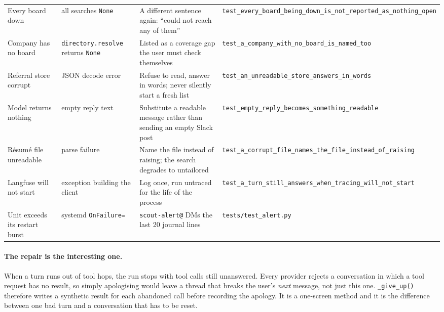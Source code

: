 \documentclass[11pt,a4paper]{article}
\begin{document}
\begin{table}[!ht]
\begin{tabularx}{\textwidth}{L{3.1cm} L{2.9cm} X L{3.4cm}}
Every board down & all searches \texttt{None} & A different sentence again: ``could not
  reach any of them'' &
  \texttt{test\_\allowbreak{}every\_\allowbreak{}board\_\allowbreak{}being\_\allowbreak{}down\_\allowbreak{}is\_\allowbreak{}not\_\allowbreak{}reported\_\allowbreak{}as\_\allowbreak{}nothing\_\allowbreak{}open} \\
Company has no board & \texttt{directory.resolve} returns \texttt{None} & Listed as a
  coverage gap the user must check themselves &
  \texttt{test\_\allowbreak{}a\_\allowbreak{}company\_\allowbreak{}with\_\allowbreak{}no\_\allowbreak{}board\_\allowbreak{}is\_\allowbreak{}named\_\allowbreak{}too} \\
Referral store corrupt & JSON decode error & Refuse to read, answer in words; never silently
  start a fresh list & \texttt{test\_\allowbreak{}an\_\allowbreak{}unreadable\_\allowbreak{}store\_\allowbreak{}answers\_\allowbreak{}in\_\allowbreak{}words} \\
Model returns nothing & empty reply text & Substitute a readable message rather than sending
  an empty Slack post & \texttt{test\_\allowbreak{}empty\_\allowbreak{}reply\_\allowbreak{}becomes\_\allowbreak{}something\_\allowbreak{}readable} \\
Résumé file unreadable & parse failure & Name the file instead of raising; the search
  degrades to untailored & \texttt{test\_\allowbreak{}a\_\allowbreak{}corrupt\_\allowbreak{}file\_\allowbreak{}names\_\allowbreak{}the\_\allowbreak{}file\_\allowbreak{}instead\_\allowbreak{}of\_\allowbreak{}raising} \\
Langfuse will not start & exception building the client & Log once, run untraced for the life
  of the process & \texttt{test\_\allowbreak{}a\_\allowbreak{}turn\_\allowbreak{}still\_\allowbreak{}answers\_\allowbreak{}when\_\allowbreak{}tracing\_\allowbreak{}will\_\allowbreak{}not\_\allowbreak{}start} \\
Unit exceeds its restart burst & systemd \texttt{OnFailure=} & \texttt{scout-alert@} DMs the
  last 20 journal lines & \texttt{tests/test\_\allowbreak{}alert.py} \\
\bottomrule
\end{tabularx}
\end{table}

\paragraph{The repair is the interesting one.} When a turn runs out of tool hops, the run
stops with tool calls still unanswered. Every provider rejects a conversation in which a tool
request has no result, so simply apologising would leave a thread that breaks the user's
\emph{next} message, not just this one. \texttt{\_\allowbreak{}give\_\allowbreak{}up()} therefore writes a synthetic
result for each abandoned call before recording the apology. It is a one-screen method and
it is the difference between one bad turn and a conversation that has to be reset.
\end{document}
